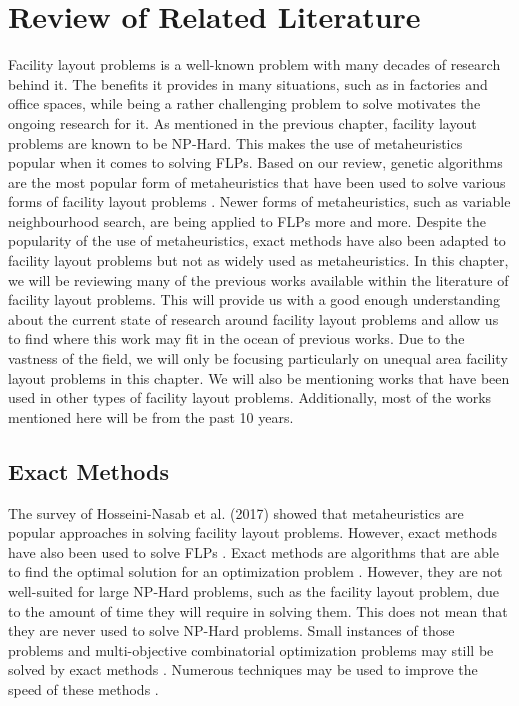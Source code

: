 \chapter{Review of Related Literature} \label{sec:rrl-title}
Facility layout problems is a well-known problem with many decades of research behind it. The benefits it provides in many situations, such as in factories and office spaces, while being a rather challenging problem to solve motivates the ongoing research for it. As mentioned in the previous chapter, facility layout problems are known to be NP-Hard. This makes the use of metaheuristics popular when it comes to solving FLPs. Based on our review, genetic algorithms are the most popular form of metaheuristics that have been used to solve various forms of facility layout problems  \cite{Hosseini-Nasab2018}. Newer forms of metaheuristics, such as variable neighbourhood search, are being applied to FLPs more and more. Despite the popularity of the use of metaheuristics, exact methods have also been adapted to facility layout problems but not as widely used as metaheuristics. In this chapter, we will be reviewing many of the previous works available within the literature of facility layout problems. This will provide us with a good enough understanding about the current state of research around facility layout problems and allow us to find where this work may fit in the ocean of previous works. Due to the vastness of the field, we will only be focusing particularly on unequal area facility layout problems in this chapter. We will also be mentioning works that have been used in other types of facility layout problems. Additionally, most of the works mentioned here will be from the past 10 years.

\section{Exact Methods}
The survey of Hosseini-Nasab et al. (2017) showed that metaheuristics are popular approaches in solving facility layout problems. However, exact methods have also been used to solve FLPs \cite{Hosseini-Nasab2018}. Exact methods are algorithms that are able to find the optimal solution for an optimization problem \cite{Dumitrescu2003}. However, they are not well-suited for large NP-Hard problems, such as the facility layout problem, due to the amount of time they will require in solving them. This does not mean that they are never used to solve NP-Hard problems. Small instances of those problems and multi-objective combinatorial optimization problems may still be solved by exact methods \cite{Jourdan2009}\cite{Ehrgott2016}. Numerous techniques may be used to improve the speed of these methods \cite{Woeginger2003}.

